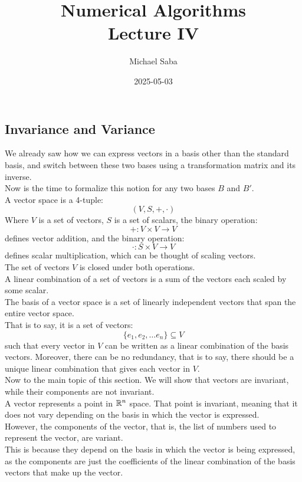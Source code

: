 \documentclass[12pt]{article}
\title{%
    \Huge Numerical Algorithms \\
    \Large Lecture IV
}
\date{2025-05-03}
\author{Michael Saba}
\begin{document}
\maketitle
\newpage
\setlength{\parindent}{0pt}

\subsection*{Invariance and Variance}

We already saw how we can express vectors
in a basis other than the standard basis,
and switch between these two bases using
a transformation matrix and its inverse. \\
Now is the time to formalize this notion
for any two bases $B$ and $B'$. \\

A vector space is a 4-tuple:
\[ (V, S, +, \cdot) \]
Where $V$ is a set of vectors,
$S$ is a set of scalars,
the binary operation:
\[ +:V \times V \to V \]
defines vector addition,
and the binary operation:
\[ \cdot: S \times V \to V \]
defines scalar multiplication,
which can be thought of scaling vectors. \\
The set of vectors $V$ is closed under
both operations. \\

A linear combination of a set of vectors
is a sum of the vectors each scaled by
some scalar. \\

The basis of a vector space
is a set of linearly independent vectors
that span the entire vector space. \\
That is to say, it is a set of vectors:
\[ \{ e_1, e_2, \dots e_n \} \subseteq V \]
such that every vector in $V$
can be written as a linear combination
of the basis vectors. Moreover,
there can be no redundancy,
that is to say,
there should be a unique linear combination
that gives each vector in $V$. \\

Now to the main topic of this section.
We will show that vectors are invariant,
while their components are not invariant. \\

A vector represents a point in $\mathbb{R}^n$
space. That point is invariant,
meaning that it does not vary depending
on the basis in which the vector is expressed. \\

However, the components of the vector,
that is, the list of numbers used to represent
the vector, are variant. \\
This is because they
depend on the basis in which the vector
is being expressed, as the components are just
the coefficients of the linear combination
of the basis vectors that make up the vector. \\
\end{document}
